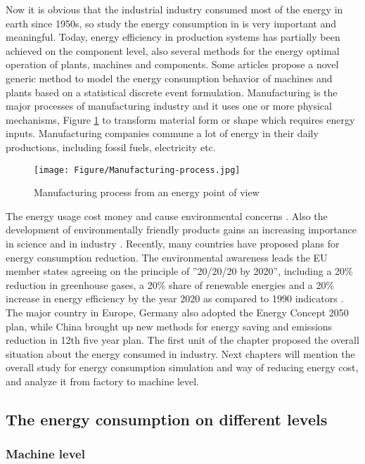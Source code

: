 Now it is obvious that the industrial industry consumed most of the energy in earth since 1950s, so study the energy consumption in is very important and meaningful. Today, energy efficiency in production systems has partially been achieved on the component level, also several methods for the energy optimal operation of plants, machines and components.  Some articles propose a novel generic method to model the energy consumption behavior of machines and plants based on a statistical discrete event formulation. Manufacturing is the major processes of manufacturing industry and it uses one or more physical mechanisms, Figure \ref{fig:Manufacturingprocess} to transform material form or shape which requires energy inputs.  Manufacturing companies commune a lot of energy in their daily productions, including fossil fuels, electricity etc.

\begin{figure}[h!]
	\centering
	\texttt{[image: Figure/Manufacturing-process.jpg]}
	\caption{Manufacturing process from an energy point of view \cite{Apostolos2013}}
	\label{fig:Manufacturingprocess}
\end{figure}

The energy usage cost money and cause environmental concerns \cite{Dietmair2009}. Also the development of environmentally friendly products gains an increasing importance in science and in industry \cite{Abele2005}. Recently, many countries have proposed plans for energy consumption reduction. The environmental awareness leads the EU member states agreeing on the principle of ''20/20/20 by 2020'', including a 20\% reduction in greenhouse gases, a 20\% share of renewable energies and a 20\% increase in energy efficiency by the year 2020 as compared to 1990 indicators \cite{Apostolos2013}. The major country in Europe, Germany also adopted the Energy Concept 2050 plan, while China brought up new methods for energy saving and emissions reduction in 12th five year plan. The first unit of the chapter proposed the overall situation about the energy consumed in industry. Next chapters will mention the overall study for energy consumption simulation and way of reducing energy cost, and analyze it from factory to machine level.


\subsection{The energy consumption on different levels}
\subsubsection{Machine level}

